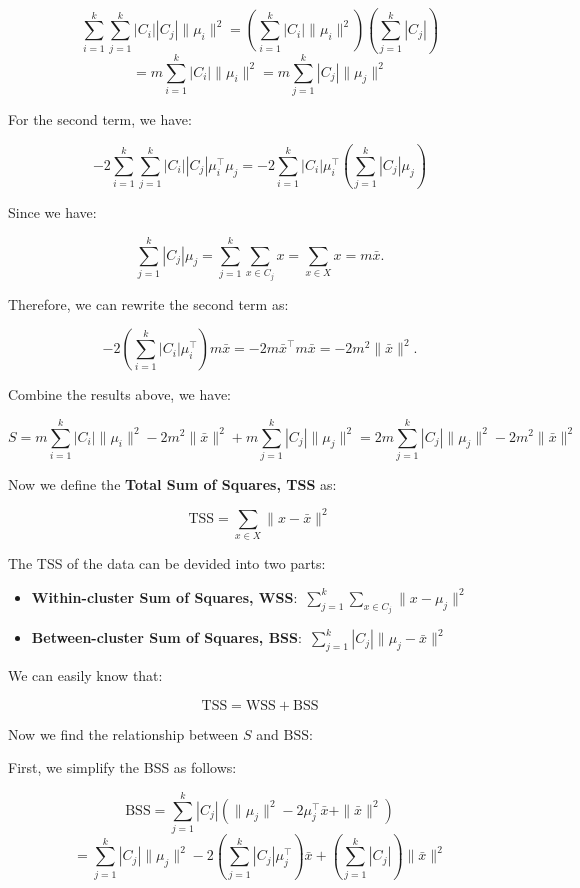 \documentclass[12pt]{article}
\begin{document}
\[
    \sum_{i=1}^k \sum_{j=1}^k |C_i| |C_j| \| \mu_i \|^2 = \left( \sum_{i=1}^k |C_i| \| \mu_i \|^2 \right) \left( \sum_{j=1}^k |C_j| \right) 
\]
\[
    = m \sum_{i=1}^k |C_i| \| \mu_i \|^2 = m \sum_{j=1}^k |C_j| \| \mu_j \|^2
\]

For the second term, we have:

\[
    -2 \sum_{i=1}^k \sum_{j=1}^k |C_i| |C_j| \mu_i^\top \mu_j = -2 \sum_{i=1}^k |C_i| \mu_i^\top \left( \sum_{j=1}^k |C_j| \mu_j \right)
\]

Since we have:

\[
\sum_{j=1}^k |C_j| \mu_j = \sum_{j=1}^k \sum_{x \in C_j} x = \sum_{x \in X} x = m \bar{x}.
\]

Therefore, we can rewrite the second term as:

\[
-2 \left( \sum_{i=1}^k |C_i| \mu_i^\top \right) m \bar{x} = -2 m \bar{x}^\top m \bar{x} = -2 m^2 \| \bar{x} \|^2.
\]

Combine the results above, we have:

\[
    S = m \sum_{i=1}^k |C_i| \| \mu_i \|^2 - 2 m^2 \| \bar{x} \|^2 + m \sum_{j=1}^k |C_j| \| \mu_j \|^2 = 2 m \sum_{j=1}^k |C_j| \| \mu_j \|^2 - 2 m^2 \| \bar{x} \|^2
\]

Now we define the \textbf{Total Sum of Squares, TSS} as:

\[
    \text{TSS} = \sum_{x \in X} \| x - \bar{x} \|^2
\]

The TSS of the data can be devided into two parts:

\begin{itemize}
    \item \textbf{Within-cluster Sum of Squares, WSS}:\ \( \sum_{j=1}^k \sum_{x \in C_j} \| x - \mu_j \|^2 \)
    \item \textbf{Between-cluster Sum of Squares, BSS}:\ \( \sum_{j=1}^k |C_j| \| \mu_j - \bar{x} \|^2 \)
\end{itemize}

We can easily know that:

\[
    \text{TSS} = \text{WSS} + \text{BSS}
\]

Now we find the relationship between \( S \) and \( \text{BSS} \):

First, we simplify the BSS as follows:

\[
    \text{BSS}= \sum_{j=1}^k |C_j| \left( \| \mu_j \|^2 - 2 \mu_j^\top \bar{x} + \| \bar{x} \|^2 \right)
\]
\[
    = \sum_{j=1}^k |C_j| \| \mu_j \|^2 - 2 \left( \sum_{j=1}^k |C_j| \mu_j^\top \right) \bar{x} + \left( \sum_{j=1}^k |C_j| \right) \| \bar{x} \|^2
\]
\end{document}
